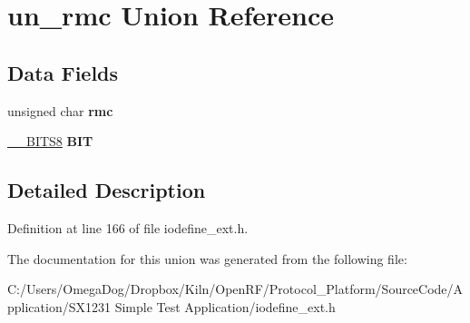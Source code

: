 \hypertarget{unionun__rmc}{\section{un\-\_\-rmc Union Reference}
\label{unionun__rmc}
}
\subsection*{Data Fields}
\begin{DoxyCompactItemize}
\item 
\hypertarget{unionun__rmc_a143258111fe110cdb866b3404f245a5c}{unsigned char {\bfseries rmc}}\label{unionun__rmc_a143258111fe110cdb866b3404f245a5c}

\item 
\hypertarget{unionun__rmc_a61c49566ad94eaffb3aaf9f2b581d91a}{\hyperlink{struct_____b_i_t_s8}{\-\_\-\-\_\-\-B\-I\-T\-S8} {\bfseries B\-I\-T}}\label{unionun__rmc_a61c49566ad94eaffb3aaf9f2b581d91a}

\end{DoxyCompactItemize}


\subsection{Detailed Description}


Definition at line 166 of file iodefine\-\_\-ext.\-h.



The documentation for this union was generated from the following file\-:\begin{DoxyCompactItemize}
\item 
C\-:/\-Users/\-Omega\-Dog/\-Dropbox/\-Kiln/\-Open\-R\-F/\-Protocol\-\_\-\-Platform/\-Source\-Code/\-Application/\-S\-X1231 Simple Test Application/iodefine\-\_\-ext.\-h\end{DoxyCompactItemize}
